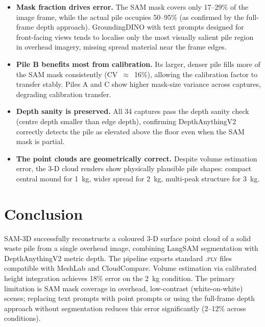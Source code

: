 \documentclass[11pt,a4paper]{article}
\begin{document}
\begin{itemize}
  \item \textbf{Mask fraction drives error.}
  The SAM mask covers only 17--29\% of the image frame, while the actual pile
  occupies 50--95\% (as confirmed by the full-frame depth approach).
  GroundingDINO with text prompts designed for front-facing views tends to
  localise only the most visually salient pile region in overhead imagery,
  missing spread material near the frame edges.

  \item \textbf{Pile B benefits most from calibration.}
  Its larger, denser pile fills more of the SAM mask consistently
  (CV~$\approx$~16\%), allowing the calibration factor to transfer stably.
  Piles A and C show higher mask-size variance across captures, degrading
  calibration transfer.

  \item \textbf{Depth sanity is preserved.}
  All 34 captures pass the depth sanity check (centre depth smaller than edge
  depth), confirming DepthAnythingV2 correctly detects the pile as elevated
  above the floor even when the SAM mask is partial.

  \item \textbf{The point clouds are geometrically correct.}
  Despite volume estimation error, the 3-D cloud renders show physically
  plausible pile shapes: compact central mound for 1~kg, wider spread for 2~kg,
  multi-peak structure for 3~kg.
\end{itemize}

\section{Conclusion}

SAM-3D successfully reconstructs a coloured 3-D surface point cloud of a solid
waste pile from a single overhead image, combining LangSAM segmentation with
DepthAnythingV2 metric depth. The pipeline exports standard \textsc{.ply} files
compatible with MeshLab and CloudCompare. Volume estimation via calibrated height
integration achieves 18\% error on the 2~kg condition. The primary limitation is
SAM mask coverage in overhead, low-contrast (white-on-white) scenes; replacing
text prompts with point prompts or using the full-frame depth approach without
segmentation reduces this error significantly (2--12\% across conditions).
\end{document}
